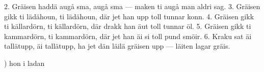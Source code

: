 2.  Gräisen haddä augå sma, augå sma —
    maken ti augå man aldri sag.
3.  Gräisen gikk ti lädähoun, ti lädähoun,
    där jet han upp toll tunnar konn.
4.  Gräisen gikk ti källardörn, ti källardörn,
    där drakk han äut toll tunnar öl.
5.  Gräisen gikk ti kammardörn, ti kammardörn,
    där jet han äi si toll pund smöir.
6.  Kraku sat äi tallätupp, äi tallätupp,
    ha jet dän läilä gräisen upp —
    \qquad{}läiten lagar gräis.

\vspace{5mm}
\tabto{0.2cm}) hon i ladan
